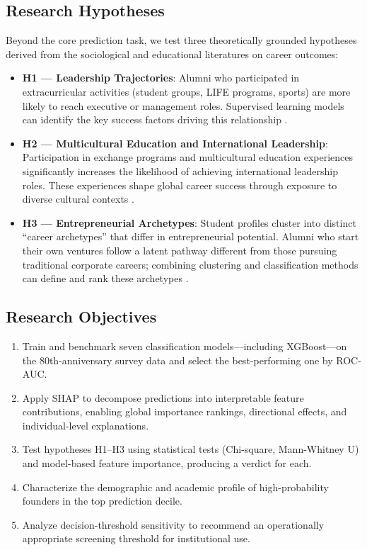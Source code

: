 \documentclass[10pt,twocolumn]{article}
\newenvironment{compactenum}{%
  \begin{enumerate}%
  \setlength{\itemsep}{1pt}\setlength{\parskip}{0pt}\setlength{\parsep}{0pt}%
}{\end{enumerate}}
\newenvironment{compactitem}{%
  \begin{itemize}%
  \setlength{\itemsep}{1pt}\setlength{\parskip}{0pt}\setlength{\parsep}{0pt}%
}{\end{itemize}}
\begin{document}
\subsection{Research Hypotheses}

Beyond the core prediction task, we test three theoretically grounded hypotheses derived from the sociological and educational literatures on career outcomes:

\begin{compactitem}
  \item \textbf{H1 — Leadership Trajectories}: Alumni who participated in extracurricular activities (student groups, LIFE programs, sports) are more likely to reach executive or management roles. Supervised learning models can identify the key success factors driving this relationship \cite{binani2024}.

  \item \textbf{H2 — Multicultural Education and International Leadership}: Participation in exchange programs and multicultural education experiences significantly increases the likelihood of achieving international leadership roles. These experiences shape global career success through exposure to diverse cultural contexts \cite{maltseva2022, udayar2025}.

  \item \textbf{H3 — Entrepreneurial Archetypes}: Student profiles cluster into distinct ``career archetypes'' that differ in entrepreneurial potential. Alumni who start their own ventures follow a latent pathway different from those pursuing traditional corporate careers; combining clustering and classification methods can define and rank these archetypes \cite{oliveira2020}.
\end{compactitem}

\subsection{Research Objectives}

\begin{compactenum}
  \item Train and benchmark seven classification models—including XGBoost—on the 80th-anniversary survey data and select the best-performing one by ROC-AUC.
  \item Apply SHAP to decompose predictions into interpretable feature contributions, enabling global importance rankings, directional effects, and individual-level explanations.
  \item Test hypotheses H1–H3 using statistical tests (Chi-square, Mann-Whitney U) and model-based feature importance, producing a verdict for each.
  \item Characterize the demographic and academic profile of high-probability founders in the top prediction decile.
  \item Analyze decision-threshold sensitivity to recommend an operationally appropriate screening threshold for institutional use.
\end{compactenum}
\end{document}
